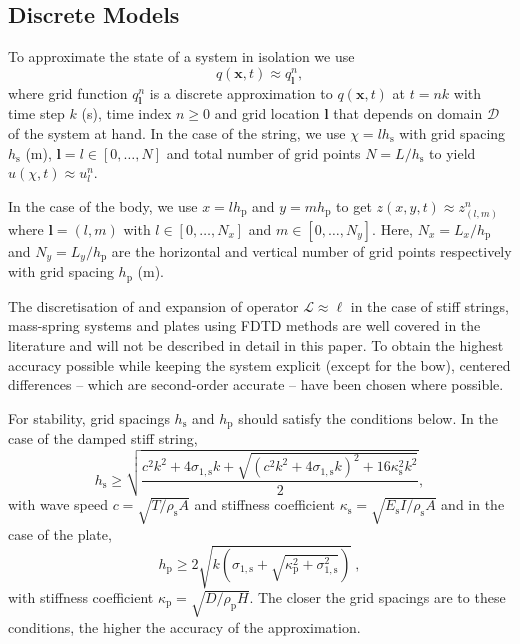 \documentclass[dvipsnames, pdftex]{article}
\def\SBcomment[#1]{\textcolor{Red}{#1}}
\def\stringx{\chi}
\def\ugen{q}
\def\us{u}
\def\um{w}
\def\up{z}
\begin{document}
\subsection{Discrete Models}
To approximate the state of a system in isolation we use
\begin{equation}\label{eq:generalDisc}
    \ugen(\boldsymbol{x},t) \approx \ugen^n_{\boldsymbol{l}}, 
\end{equation} 
where grid function $\ugen^n_{\boldsymbol{l}}$ is a discrete approximation to $\ugen({\boldsymbol{x}},t)$ at $t=nk$ with time step $k$ (s), time index $n\geq 0$ and grid location $\boldsymbol{l}$ that depends on domain $\mathcal{D}$ of the system at hand. In the case of the string, we use $\stringx=lh_\text{s}$ with grid spacing $h_\text{s}$ (m), $\boldsymbol{l} = l \in [0,\hdots, N]$ and total number of grid points $N=L/h_\text{s}$ to yield $\us(\stringx,t) \approx \us_l^n$.
% 

In the case of the body, we use $x=lh_\text{p}$ and $y=mh_\text{p}$ to get $\up(x, y, t) \approx \up_{(l,m)}^n$ where $\boldsymbol{l} = (l,m)$ with $l\in[0,\hdots,N_x]$ and $m\in[0,\hdots,N_y]$. Here, $N_x = L_x / h_\text{p}$ and $N_y = L_y / h_\text{p}$ are the horizontal and vertical number of grid points respectively with grid spacing $h_\text{p}$ (m).

 
The discretisation of and expansion of operator $\mathcal{L}\approx \ell$ in the case of stiff strings, mass-spring systems and plates using FDTD methods are well covered in the literature \cite{bilbao2009numerical} and will not be described in detail in this paper. To obtain the highest accuracy possible while keeping the system explicit (except for the bow), centered differences -- which are second-order accurate -- have been chosen where possible. 

For stability, grid spacings $h_\text{s}$ and $h_\text{p}$ should satisfy the conditions below. In the case of the damped stiff string,
\begin{equation}
    h_\text{s} \geq \sqrt{\frac{c^2k^2+4\sigma_{1,\text{s}}k+\sqrt{(c^2k^2+4\sigma_{1,\text{s}}k)^2+16\kappa_\text{s}^2k^2}}{2}},
\end{equation}
with wave speed $c = \sqrt{T/\rho_\text{s}A}$ and stiffness coefficient $\kappa_\text{s} = \sqrt{E_\text{s}I/\rho_\text{s}A}$ and in the case of the plate,
\begin{equation}\label{eq:gridSpacingPlate}
    h_\text{p} \geq 2\sqrt{k\left(\sigma_{1,\text{s}} + \sqrt{\kappa_\text{p}^2 + \sigma_{1,\text{s}}^2}\right)}\ ,
\end{equation}
with stiffness coefficient $\kappa_\text{p} = \sqrt{D/\rho_\text{p}H}$. The closer the grid spacings are to these conditions, the higher the accuracy of the approximation. 
\end{document}
